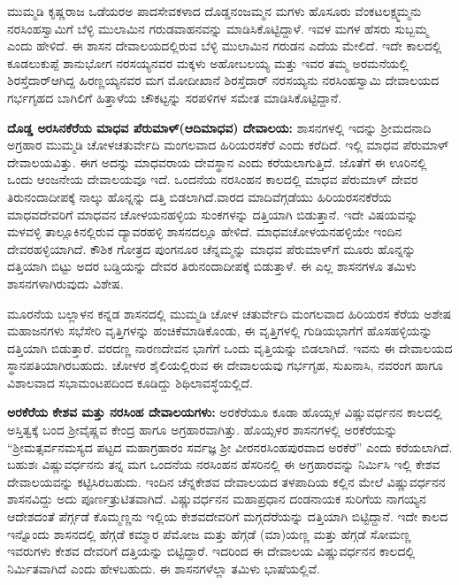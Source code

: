 ಮುಮ್ಮಡಿ ಕೃಷ್ಣರಾಜ ಒಡೆಯರಅ ಪಾದಸೇವಕಳಾದ ದೊಡ್ಡನಂಜಮ್ಮನ ಮಗಳು ಹೊಸೂರು ವೆಂಕಟಲಕ್ಷ್ಮಮ್ಮನು ನರಸಿಂಹಸ್ವಾಮಿಗೆ ಬೆಳ್ಳಿ ಮುಲಾಮಿನ ಗರುಡವಾಹನವನ್ನು ಮಾಡಿಸಿಕೊಟ್ಟಿದ್ದಾಳೆ. ಇವಳ ಮಗಳ ಹೆಸರು ಸುಬ್ಬಮ್ಮ ಎಂದು ಹೇಳಿದೆ. ಈ ಶಾಸನ ದೇವಾಲಯದಲ್ಲಿರುವ ಬೆಳ್ಳಿ ಮುಲಾಮಿನ ಗರುಡನ ಎದೆಯ ಮೇಲಿದೆ. ಇದೇ ಕಾಲದಲ್ಲಿ ಕೂಡಲುಕುಪ್ಪೆ ಶಾನುಭೋಗ ನರಸಯ್ಯನವರ ಮಕ್ಕಳು ಅಹೋಬಲಯ್ಯ ಮತ್ತು ಇವರ ತಮ್ಮ ಅರಮನೆಯಲ್ಲಿ ಶಿರಸ್ತೆದಾರ್​ ಆಗಿದ್ದ ಹಿರಣ್ಣಯ್ಯನವರ ಮಗ ಮೋದೀಖಾನೆ ಶಿರಸ್ತೆದಾರ್​ ನರಸಯ್ಯನು ನರಸಿಂಹಸ್ವಾಮಿ ದೇವಾಲಯದ ಗರ್ಭಗೃಹದ ಬಾಗಿಲಿಗೆ ಹಿತ್ತಾಳೆಯ ಚೌಕಟ್ಟನ್ನು ಸರಪಳಿಗಳ ಸಮೇತ ಮಾಡಿಸಿಕೊಟ್ಟಿದ್ದಾನೆ.

\textbf{ದೊಡ್ಡ ಅರಸಿನಕೆರೆಯ ಮಾಧವ ಪೆರುಮಾಳ್​(ಆದಿಮಾಧವ) ದೇವಾಲಯ:} ಶಾಸನಗಳಲ್ಲಿ ಇದನ್ನು ಶ‍್ರೀಮದನಾದಿ ಅಗ್ರಹಾರ ಮುಮ್ಮಡಿ ಚೋಳಚತುರ್ವೇದಿ ಮಂಗಲವಾದ ಹಿರಿಯರಸಕೆರೆ ಎಂದು ಕರೆದಿದೆ. ಇಲ್ಲಿ ಮಾಧವ ಪೆರುಮಾಳ್​ ದೇವಾಲಯವಿತ್ತು. ಈಗ ಅದನ್ನು ಮಾಧವರಾಯ ದೇವಸ್ಥಾನ ಎಂದು ಕರೆಯಲಾಗುತ್ತಿದೆ. ಜೊತೆಗೆ ಈ ಊರಿನಲ್ಲಿ ಒಂದು ಆಂಜನೇಯ ದೇವಾಲಯವೂ ಇದೆ. ಒಂದನೆಯ ನರಸಿಂಹನ ಕಾಲದಲ್ಲಿ ಮಾಧವ ಪೆರುಮಾಳ್​ ದೇವರ ತಿರುನಂದಾದೀಪಕ್ಕೆ ನಾಲ್ಕು ಹೊನ್ನನ್ನು ದತ್ತಿ ಬಿಡಲಾಗಿದೆ.ವಾರದ ಮಾದಿವೆಗ್ಗಡೆಯು ಹಿರಿಯರಸನಕೆರೆಯ ಮಾಧವದೇವರಿಗೆ ಮಾಧವನ ಚೋಳಯನಹಳ್ಳಿಯ ಸುಂಕಗಳನ್ನು ದತ್ತಿಯಾಗಿ ಬಿಡುತ್ತಾನೆ. ಇದೇ ವಿಷಯವನ್ನು ಮಳವಳ್ಳಿ ತಾಲ್ಲೂಕಿನಲ್ಲಿರುವ ದ್ಯಾವರಹಳ್ಳಿ ಶಾಸನದಲ್ಲೂ ಹೇಳಿದೆ. ಮಾಧವಚೋಳಯನಹಳ್ಳಿಯೇ ಇಂದಿನ ದೇವರಹಳ್ಳಿಯಾಗಿದೆ. ಕೌಶಿಕ ಗೋತ್ರದ ಪುಂಗನೂರ ಚೆನ್ನಮ್ಮನ್ನು ಮಾಧವ ಪೆರುಮಾಳ್​ಗೆ ಮೂರು ಹೊನ್ನನ್ನು ದತ್ತಿಯಾಗಿ ಬಿಟ್ಟು ಅದರ ಬಡ್ಡಿಯನ್ನು ದೇವರ ತಿರುನಂದಾದೀಪಕ್ಕೆ ಬಿಡುತ್ತಾಳೆ. ಈ ಎಲ್ಲ ಶಾಸನಗಳೂ ತಮಿಳು ಶಾಸನಗಳಾಗಿರುವುದು ವಿಶೇಷ. 

ಮೂರನೆಯ ಬಲ್ಲಾಳನ ಕನ್ನಡ ಶಾಸನದಲ್ಲಿ ಮುಮ್ಮಡಿ ಚೋಳ ಚತುರ್ವೇದಿ ಮಂಗಲವಾದ ಹಿರಿಯರಸ ಕೆರೆಯ ಅಶೇಷ ಮಹಾಜನಗಳು ಸಭೆಸೇರಿ ವೃತ್ತಿಗಳನ್ನು ಹಂಚಿಕೆಮಾಡಿಕೊಂಡು, ಈ ವೃತ್ತಿಗಳಲ್ಲಿ ಗುಡಿಯಭಾಗೆಗೆ ಹೊಸಹಳ್ಳಿಯನ್ನು ದತ್ತಿಯಾಗಿ ಬಿಡುತ್ತಾರೆ. ವರದಣ್ಣ ನಾರಣದೇವನ ಭಾಗೆಗೆ ಒಂದು ವೃತ್ತಿಯನ್ನು ಬಿಡಲಾಗಿದೆ. ಇವನು ಈ ದೇವಾಲಯದ ಸ್ಥಾನಪತಿಯಾಗಿರಬಹುದು. ಚೋಳರ ಶೈಲಿಯಲ್ಲಿರುವ ಈ ದೇವಾಲಯವು ಗರ್ಭಗೃಹ, ಸುಖನಾಸಿ, ನವರಂಗ ಹಾಗೂ ವಿಶಾಲವಾದ ಸಭಾಮಂಟಪದಿಂದ ಕೂಡಿದ್ದು ಶಿಥಿಲಾವಸ್ಥೆಯಲ್ಲಿದೆ.

\textbf{ಅರಕೆರೆಯ ಕೇಶವ ಮತ್ತು ನರಸಿಂಹ ದೇವಾಲಯಗಳು:} ಅರಕೆರೆಯೂ ಕೂಡಾ ಹೊಯ್ಸಳ ವಿಷ್ಣುವರ್ಧನನ ಕಾಲದಲ್ಲಿ ಅಸ್ತಿತ್ವಕ್ಕೆ ಬಂದ ಶ‍್ರೀವೈಷ್ಣವ ಕೇಂದ್ರ ಹಾಗೂ ಅಗ್ರಹಾರವಾಗಿತ್ತು. ಹೊಯ್ಸಳರ ಶಾಸನಗಳಲ್ಲಿ ಅರಕೆರೆಯನ್ನು “ಶ‍್ರೀಮತ್ಸರ್ವನಮಸ್ಯದ ಪಟ್ಟದ ಮಹಾಗ್ರಹಾರಂ ಸರ್ವಜ್ಞ ಶ‍್ರೀ ವೀರನರಸಿಂಹಪುರವಾದ ಅರಕೆರೆ” ಎಂದು ಕರೆಯಲಾಗಿದೆ. ಬಹುಶಃ ವಿಷ್ಣುವರ್ಧನನು ತನ್ನ ಮಗ ಒಂದನೆಯ ನರಸಿಂಹನ ಹೆಸರಿನಲ್ಲಿ ಈ ಅಗ್ರಹಾರವನ್ನು ನಿರ್ಮಿಸಿ ಇಲ್ಲಿ ಕೇಶವ ದೇವಾಲಯವನ್ನು ಕಟ್ಟಿಸಿರಬಹುದು. ಇಂದಿನ ಚೆನ್ನಕೇಶವ ದೇವಾಲಯದ ತಳಪಾದಿಯ ಕಲ್ಲಿನ ಮೇಲೆ ವಿಷ್ಣುವರ್ಧನನ ಶಾಸನವಿದ್ದು ಅದು ಪೂರ್ಣತ್ರುಟಿತವಾಗಿದೆ. ವಿಷ್ಣುವರ್ಧನನ ಮಹಾಪ್ರಧಾನ ದಂಡನಾಯಕ ಸುರಿಗೆಯ ನಾಗಯ್ಯನ ಆದೇಶದಂತೆ ಪೆರ್ಗ್ಗಡೆ ಕೊಮ್ಮಣ್ಣನು ಇಲ್ಲಿಯ ಕೇಶವದೇವರಿಗೆ ಮಗ್ಗದೆರೆಯನ್ನು ದತ್ತಿಯಾಗಿ ಬಿಟ್ಟಿದ್ದಾನೆ. ಇದೇ ಕಾಲದ ಇನ್ನೊಂದು ಶಾಸನದಲ್ಲಿ ಹೆಗ್ಗಡೆ ಕಮ್ಮಾರ ಪೆಮೋಜ ಮತ್ತು ಹೆಗ್ಗಡೆ (ಮಾ)ಯಣ್ಣ ಮತ್ತು ಹೆಗ್ಗಡೆ ಸೋಮಣ್ಣ ಇವರುಗಳು ಕೇಶವ ದೇವರಿಗೆ ದತ್ತಿಯನ್ನು ಬಿಟ್ಟಿದ್ದಾರೆ. ಇದರಿಂದ ಈ ದೇವಾಲಯ ವಿಷ್ಣುವರ್ಧನನ ಕಾಲದಲ್ಲಿ ನಿರ್ಮಿತವಾಗಿದೆ ಎಂದು ಹೇಳಬಹುದು. ಈ ಶಾಸನಗಳೆಲ್ಲಾ ತಮಿಳು ಭಾಷೆಯಲ್ಲಿವೆ. 


